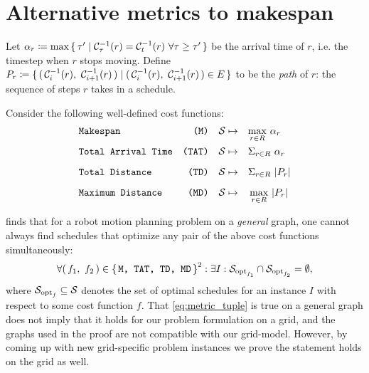 \section{Alternative metrics to makespan}\label{chapter:alternative_metrics}

Let \(\alpha_r \coloneqq \max\set{\tau' \mid \ensuremath{\mathcal{C}_{\tau}}^{-1}(r) = \ensuremath{\mathcal{C}_{t}}^{-1}(r)\ \forall \tau \geq \tau'}\) be the arrival time of \(r\), i.e. the timestep when \(r\) stops moving. 
Define \(P_r \coloneqq \set{ (\,  \ensuremath{\mathcal{C}_{i}}^{-1}(r),\ \ensuremath{\mathcal{C}_{i + 1}}^{-1}(r)  \,) \mid (\,  \ensuremath{\mathcal{C}_{i}}^{-1}(r),\ \ensuremath{\mathcal{C}_{i + 1}}^{-1}(r)  \,) \in E }\) to be the \emph{path} of \(r\): the sequence of steps \(r\) takes in a schedule. 

Consider the following well-defined cost functions:
\begin{align*}
	& \texttt{Makespan} 				& \texttt{(M)} && \mathcal{S} \mapsto \quad & \smash{\max_{r \in R}} \ \alpha_r 	\\[2mm] 
	& \texttt{Total Arrival Time} 	& \texttt{(TAT)} && \mathcal{S} \mapsto \quad & \Sigma_{r \in R} \ \alpha_r 		\\[2mm]
	& \texttt{Total Distance} 		& \texttt{(TD)} && \mathcal{S} \mapsto \quad & \Sigma_{r \in R} \ \lvert P_r\rvert 		\\[2mm]
	& \texttt{Maximum Distance} 		& \texttt{(MD)} && \mathcal{S} \mapsto \quad & \max_{r \in R} \ \lvert P_r\rvert
\end{align*}


\cite{corr/YuL15c} finds that for a robot motion planning problem on a \emph{general} graph, one cannot always find schedules that optimize any pair of the above cost functions simultaneously: 
\begin{align}\label{eq:metric_tuple}
	\forall (\, f_1,\ f_2 \,) \in \set{\texttt{M, TAT, TD, MD}}^2 : \exists I : \mathcal{S}_{\text{opt}_{f_1}} \cap \mathcal{S}_{\text{opt}_{f_2}} = \emptyset,
\end{align}
where \(\mathcal{S}_{\text{opt}_f} \subseteq \mathcal{S}\) denotes the set of optimal schedules for an instance \(I\) with respect to some cost function \(f\). 
That \cref{eq:metric_tuple} is true on a general graph does not imply that it holds for our problem formulation on a grid, and the graphs used in the proof are not compatible with our grid-model. 
However, by coming up with new grid-specific problem instances we prove the statement holds on the grid as well.

